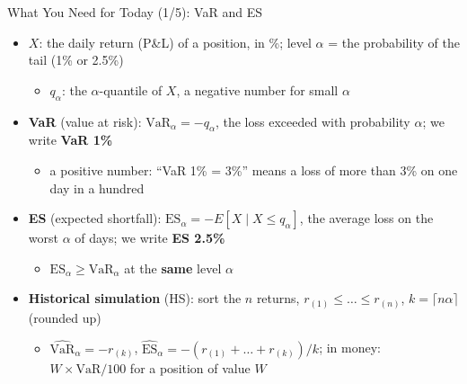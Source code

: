 \begin{frame}{What You Need for Today (1/5): VaR and ES}
\itemsize{\small}
\begin{itemize}
    \item $X$: the daily return (P\&L) of a position, in \%; level $\alpha$ = the probability of the tail (1\% or 2.5\%)
    \begin{itemize}
        \item $q_\alpha$: the $\alpha$-quantile of $X$, a negative number for small $\alpha$
    \end{itemize}
    \item \textbf{VaR} (value at risk): $\mathrm{VaR}_\alpha = -q_\alpha$, the loss exceeded with probability $\alpha$; we write \textbf{VaR 1\%}
    \begin{itemize}
        \item a positive number: ``VaR 1\% = 3\%'' means a loss of more than 3\% on one day in a hundred
    \end{itemize}
    \item \textbf{ES} (expected shortfall): $\mathrm{ES}_\alpha = -E[X \mid X \le q_\alpha]$, the average loss on the worst $\alpha$ of days; we write \textbf{ES 2.5\%}
    \begin{itemize}
        \item $\mathrm{ES}_\alpha \ge \mathrm{VaR}_\alpha$ at the \textbf{same} level $\alpha$
    \end{itemize}
    \item \textbf{Historical simulation} (HS): sort the $n$ returns, $r_{(1)} \le \dots \le r_{(n)}$, $k = \lceil n\alpha \rceil$ (rounded up)
    \begin{itemize}
        \item $\widehat{\mathrm{VaR}}_\alpha = -r_{(k)}$, \quad $\widehat{\mathrm{ES}}_\alpha = -(r_{(1)} + \dots + r_{(k)})/k$; in money: $W \times \mathrm{VaR}/100$ for a position of value $W$
    \end{itemize}
\end{itemize}
\end{frame}

